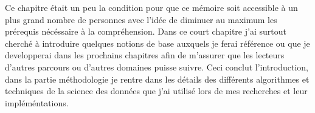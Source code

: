 Ce chapitre était un peu la condition pour que ce mémoire soit accessible à un plus grand nombre de personnes avec l'idée de diminuer au maximum les prérequis nécéssaire à la compréhension. Dans ce court chapitre j'ai surtout cherché à introduire quelques notions de base auxquels je ferai référence ou que je developperai dans les prochains chapitres afin de m'assurer que les lecteurs d'autres parcours ou d'autres domaines puisse suivre. Ceci conclut l'introduction, dans la partie méthodologie je rentre dans les détails des différents algorithmes et techniques de la science des données que j'ai utilisé lors de mes recherches et leur impléméntations.